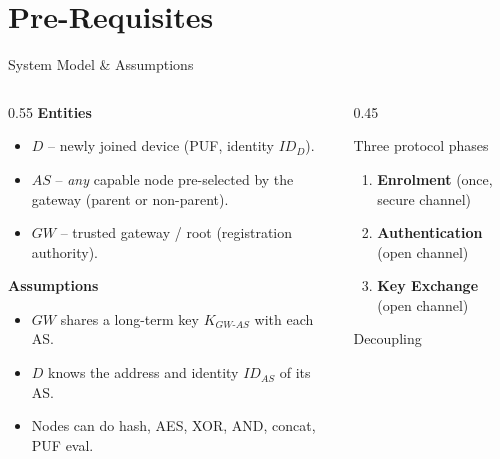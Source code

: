 \section{Pre-Requisites}

\begin{frame}{System Model \& Assumptions}
    \scriptsize
    \setlength{\itemsep}{0pt}
    \begin{columns}[T]
        \begin{column}{0.55\textwidth}
            \textbf{Entities}
            \begin{itemize}\setlength{\itemsep}{1pt}
                \item \textbf{$D$} -- newly joined device (PUF, identity $ID_D$).
                \item \textbf{$AS$} -- \emph{any} capable node pre-selected by the gateway (parent or non-parent).
                \item \textbf{$GW$} -- trusted gateway / root (registration authority).
            \end{itemize}
            \vspace{0.1cm}
            \textbf{Assumptions}
            \begin{itemize}\setlength{\itemsep}{1pt}
                \item $GW$ shares a long-term key $K_{GW\text{-}AS}$ with each AS.
                \item $D$ knows the address and identity $ID_{AS}$ of its AS.
                \item Nodes can do hash, AES, XOR, AND, concat, PUF eval.
            \end{itemize}
        \end{column}
        \begin{column}{0.45\textwidth}
            \begin{block}{Three protocol phases}
                \begin{enumerate}\setlength{\itemsep}{1pt}
                    \item \textbf{Enrolment} {\scriptsize (once, secure channel)}
                    \item \textbf{Authentication} {\scriptsize (open channel)}
                    \item \textbf{Key Exchange} {\scriptsize (open channel)}
                \end{enumerate}
            \end{block}
            \begin{exampleblock}{Decoupling}

\end{exampleblock}
\end{column}
\end{columns}
\end{frame}
